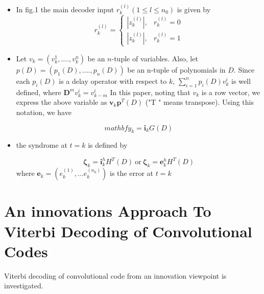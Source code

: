 \documentclass[fontsize=12pt]{article}
\theoremstyle{definition}
\begin{document}
\begin{enumerate}
\begin{itemize}
\item In fig.1  the main decoder input $r_k^{(l)}(1 \leq l \leq n_0)$ is given by 
\begin{equation}
    r_k^{(l)} =
    \begin{cases}
      |z_k^{(l)}|, &  r_k^{(l)}= 0 \\
      |z_k^{(l)}|, & r_k^{(l)}=1
    \end{cases}
  \end{equation}

\item Let $v_k = (v_k^1,...., v_k^n)$
 be an $n$-tuple of variables. Also, let
$p(D) = (p_1(D),...., p_n(D))$ be an n-tuple of polynomials
in $D$. Since each $p_i (D)$ is a delay operator with respect
to $k$, $\sum_{i=1}^{n}p_i(D)v_k^i$
is well defined, where $\mathbf{D}^mv^i_k
=v^i_{k-m}$
In this paper, noting that $v_k$ is a row vector, we express the
above variable as $\mathbf{v}_k \mathbf{p}^T (D)$ ("T " means transpose). Using this
notation, we have 

\begin{equation}
mathbf{y}_k =\mathbf{i}_kG(D)
\end{equation}

\item the syndrome  at $t=k$ is defined by

\begin{equation}
\mathbf{\zeta}_k =\mathbf{i}_k^hH^T(D) ~\text{or} ~ \mathbf{\zeta}_k =\mathbf{e}_k^hH^T(D)
\end{equation}
where $\mathbf{e}_k=(e_k^{(1)},...e_k^{(n_0)})$ is the error at $t=k$
\end{itemize}

\end{enumerate}


\section{An innovations Approach To Viterbi Decoding of Convolutional Codes}
Viterbi decoding of convolutional code from
an innovation viewpoint is investigated.
\end{document}
